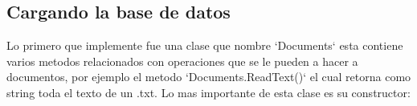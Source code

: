 \documentclass[10pt,a4paper]{report}
\begin{document}
\subsection*{Cargando la base de datos}
	Lo primero que implemente fue una clase que nombre `Documents` esta contiene varios metodos relacionados con operaciones que se le pueden a hacer a documentos, por ejemplo el metodo `Documents.ReadText()` el cual retorna como string toda el texto de un .txt. Lo mas importante de esta clase es su constructor:
	
\end{document}
